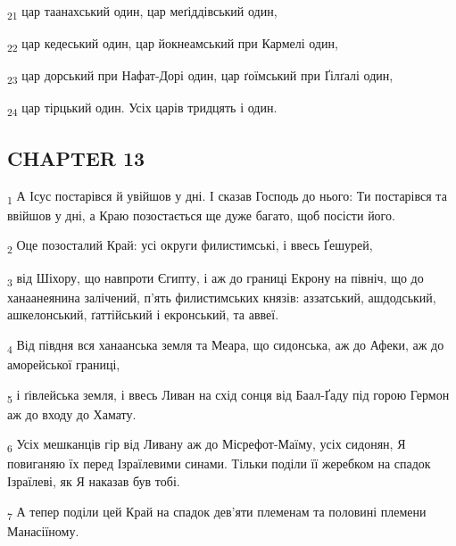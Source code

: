 \begin{tcolorbox}
\textsubscript{21} цар таанахський один, цар меґіддівський один,
\end{tcolorbox}
\begin{tcolorbox}
\textsubscript{22} цар кедеський один, цар йокнеамський при Кармелі один,
\end{tcolorbox}
\begin{tcolorbox}
\textsubscript{23} цар дорський при Нафат-Дорі один, цар ґоїмський при Ґілґалі один,
\end{tcolorbox}
\begin{tcolorbox}
\textsubscript{24} цар тірцький один. Усіх царів тридцять і один.
\end{tcolorbox}
\subsection{CHAPTER 13}
\begin{tcolorbox}
\textsubscript{1} А Ісус постарівся й увійшов у дні. І сказав Господь до нього: Ти постарівся та ввійшов у дні, а Краю позостається ще дуже багато, щоб посісти його.
\end{tcolorbox}
\begin{tcolorbox}
\textsubscript{2} Оце позосталий Край: усі округи филистимські, і ввесь Ґешурей,
\end{tcolorbox}
\begin{tcolorbox}
\textsubscript{3} від Шіхору, що навпроти Єгипту, і аж до границі Екрону на північ, що до ханаанеянина залічений, п'ять филистимських князів: аззатський, ашдодський, ашкелонський, ґаттійський і екронський, та аввеї.
\end{tcolorbox}
\begin{tcolorbox}
\textsubscript{4} Від півдня вся ханаанська земля та Меара, що сидонська, аж до Афеки, аж до аморейської границі,
\end{tcolorbox}
\begin{tcolorbox}
\textsubscript{5} і ґівлейська земля, і ввесь Ливан на схід сонця від Баал-Ґаду під горою Гермон аж до входу до Хамату.
\end{tcolorbox}
\begin{tcolorbox}
\textsubscript{6} Усіх мешканців гір від Ливану аж до Місрефот-Маїму, усіх сидонян, Я повиганяю їх перед Ізраїлевими синами. Тільки поділи її жеребком на спадок Ізраїлеві, як Я наказав був тобі.
\end{tcolorbox}
\begin{tcolorbox}
\textsubscript{7} А тепер поділи цей Край на спадок дев'яти племенам та половині племени Манасіїному.
\end{tcolorbox}
